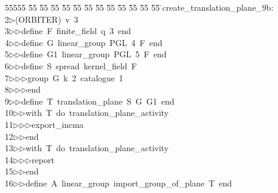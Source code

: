 %
%
\begin{tabbing}
55555 \= 55 \= 55 \= 55 \= 55 \= 55 \= 55 \= 55 \= 55 \= 55 \= 55 \= 55 \= 55 \= \>create\_translation\_plane\_9b:\\[0pt]
2\>$\triangleright$\>(ORBITER)\ v\ 3\ \\[0pt]
3\>$\triangleright$\>$\triangleright$\>define\ F\ finite\_field\ q\ 3\ end\ \\[0pt]
4\>$\triangleright$\>$\triangleright$\>define\ G\ linear\_group\ PGL\ 4\ F\ end\ \\[0pt]
5\>$\triangleright$\>$\triangleright$\>define\ G1\ linear\_group\ PGL\ 5\ F\ end\ \\[0pt]
6\>$\triangleright$\>$\triangleright$\>define\ S\ spread\ kernel\_field\ F\ \\[0pt]
7\>$\triangleright$\>$\triangleright$\>$\triangleright$\>group\ G\ k\ 2\ catalogue\ 1\ \\[0pt]
8\>$\triangleright$\>$\triangleright$\>$\triangleright$\>end\ \\[0pt]
9\>$\triangleright$\>$\triangleright$\>define\ T\ translation\_plane\ S\ G\ G1\ end\ \\[0pt]
10\>$\triangleright$\>$\triangleright$\>with\ T\ do\ translation\_plane\_activity\ \\[0pt]
11\>$\triangleright$\>$\triangleright$\>$\triangleright$\>export\_incma\ \\[0pt]
12\>$\triangleright$\>$\triangleright$\>end\ \\[0pt]
13\>$\triangleright$\>$\triangleright$\>with\ T\ do\ translation\_plane\_activity\ \\[0pt]
14\>$\triangleright$\>$\triangleright$\>$\triangleright$\>report\ \\[0pt]
15\>$\triangleright$\>$\triangleright$\>end\ \\[0pt]
16\>$\triangleright$\>$\triangleright$\>define\ A\ linear\_group\ import\_group\_of\_plane\ T\ end\ \\[0pt]

\end{tabbing}
